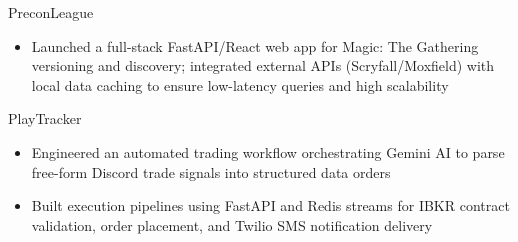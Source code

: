 \cvproject
        {PreconLeague}
        {\href{https://github.com/atauln/PreconLeague}{}}
        {
                \begin{itemize}
                        \item Launched a full-stack FastAPI/React web app for Magic: The Gathering versioning and discovery; integrated external APIs (Scryfall/Moxfield) with local data caching to ensure low-latency queries and high scalability
                \end{itemize}
        }
        {  }
        {}

\cvproject
        {PlayTracker}
        {\href{https://github.com/bobbykdhan/PlayTracker}{}}
        {
                \begin{itemize}
                        \item Engineered an automated trading workflow orchestrating Gemini AI to parse free-form Discord trade signals into structured data orders
                        \item Built execution pipelines using FastAPI and Redis streams for IBKR contract validation, order placement, and Twilio SMS notification delivery
                \end{itemize}
        }
        {   }
        {}
